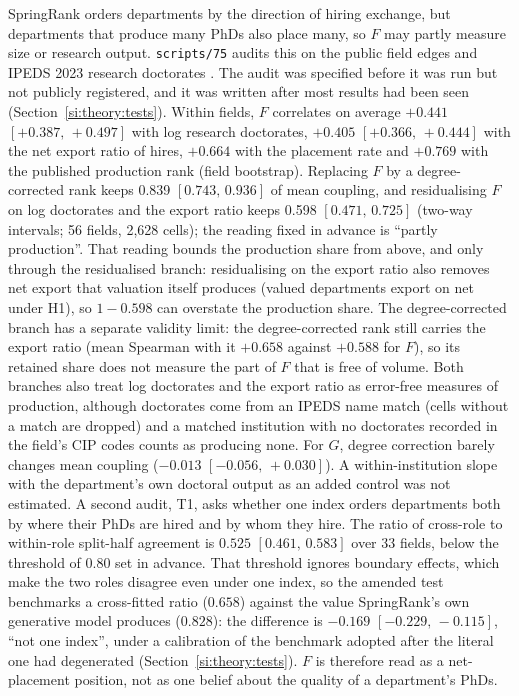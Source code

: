\documentclass[11pt]{article}
\newcommand{\ci}[2]{$[#1,\allowbreak\,#2]$}
\newcommand{\scr}[1]{\texttt{scripts/#1}}
\begin{document}
SpringRank orders departments by the direction of hiring exchange, but departments that produce many PhDs also
place many, so $F$ may partly measure size or research output. \scr{75} audits this on the public field edges and
IPEDS 2023 research doctorates \citep{nces_ipeds}. The audit was specified before it was run but not publicly registered, and it was written after most results had
been seen (Section~\ref{si:theory:tests}). Within fields,
$F$ correlates on average $+0.441$ \ci{+0.387}{+0.497} with log research doctorates, $+0.405$ \ci{+0.366}{+0.444}
with the net export ratio of hires, $+0.664$ with the placement rate and $+0.769$ with the published production rank
(field bootstrap). Replacing $F$ by a degree-corrected rank keeps 0.839 \ci{0.743}{0.936} of mean coupling, and
residualising $F$ on log doctorates and the export ratio keeps 0.598 \ci{0.471}{0.725} (two-way intervals; 56
fields, 2,628 cells); the reading fixed in advance is ``partly production''. That reading bounds the production
share from above, and only through the residualised branch: residualising on the export ratio also removes net
export that valuation itself produces (valued departments export on net under H1), so $1-0.598$ can overstate the
production share. The degree-corrected branch has a separate validity limit: the degree-corrected rank still
carries the export ratio (mean Spearman with it $+0.658$ against $+0.588$ for $F$), so its retained share does not
measure the part of $F$ that is free of volume. Both branches also treat log doctorates and the export ratio as
error-free measures of production, although doctorates come from an IPEDS name match (cells without a match are
dropped) and a matched institution with no doctorates recorded in the field's CIP codes counts as producing none. For $G$, degree correction barely changes mean coupling ($-0.013$
\ci{-0.056}{+0.030}). A within-institution slope with the department's own doctoral output as an added control was not estimated.
A second audit, T1, asks whether one index orders departments both by where their PhDs are hired and by whom they
hire. The ratio of cross-role to within-role split-half agreement is $0.525$ \ci{0.461}{0.583} over 33 fields,
below the threshold of 0.80 set in advance. That threshold ignores boundary effects, which make the two roles
disagree even under one index, so the amended test benchmarks a cross-fitted ratio ($0.658$) against the value
SpringRank's own generative model produces ($0.828$): the difference is $-0.169$ \ci{-0.229}{-0.115}, ``not one
index'', under a calibration of the benchmark adopted after the literal one had degenerated
(Section~\ref{si:theory:tests}). $F$ is therefore read as a net-placement position, not as one belief about the
quality of a department's PhDs.
\end{document}
